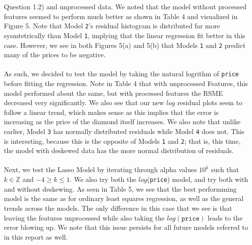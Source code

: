 \documentclass[11pt,letterpaper]{article}
\begin{document}
Question 1.2) and unprocessed data. We noted that the model without processed features
seemed to perform much better as shown in Table 4 and visualized in Figure 5. Note that
Model \texttt{2}'s residual histogram is distributed far more sysmtetrically than 
Model \texttt{1}, implying that the linear regression fit better in this case.
However, we see in both Figures 5(a) and 5(b) that Models \texttt{1} and \texttt{2} 
predict many of the prices to be negative. \\\\
As such, we decided to test the model by taking the natural logrithm of 
\texttt{price} before fitting the regression. Note in Table 4 that with unprocessed 
Features, this model performed about the same, but with processed features the RSME 
decreased very significantly. We also see that our new $log$ residual plots seem to 
follow a linear trend, which makes sense as this implies that the error is increasing
as the price of the diamond itself increases. We also note that unlike earlier, Model
\texttt{3} has normally distributed residuals while Model \texttt{4} does not. This is
interesting, because this is the opposite of Models \texttt{1} and \texttt{2}; that is,
this time, the model with deskewed data has the more normal distribution of residuals.\\\\

Next, we test the Lasso Model by iterating through alpha values $10^k$ such that 
$k\in \mathbb{Z}$ and $-4 \geq k \leq 1$. We also try both the $log$(\texttt{price})
model, and try both with and without deskewing. As seen in Table 5, we see that the best performming 
model is the same as for ordinary least squares regression, as well as the general trends across 
the models. The only difference in this case that we see is that leaving the features unprocessed 
while also taking the $log(\texttt{price})$ leads to the error blowing up. We note that this issue 
persists for all future models referred to in this report as well. 
\end{document}
